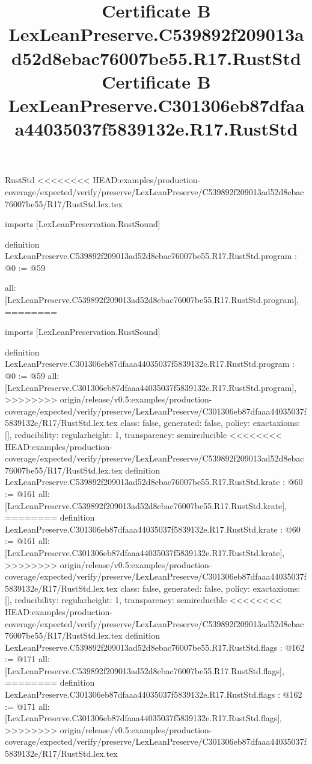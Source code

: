 \begin{lexlean}{RustStd}
<<<<<<<< HEAD:examples/production-coverage/expected/verify/preserve/LexLeanPreserve/C539892f209013ad52d8ebac76007be55/R17/RustStd.lex.tex
\title{Certificate B LexLeanPreserve.C539892f209013ad52d8ebac76007be55.R17.RustStd}
\begin{coremodule}
imports [LexLeanPreservation.RustSound]

definition LexLeanPreserve.C539892f209013ad52d8ebac76007be55.R17.RustStd.program : @0 := @59 {
  all: [LexLeanPreserve.C539892f209013ad52d8ebac76007be55.R17.RustStd.program],
========
\title{Certificate B LexLeanPreserve.C301306eb87dfaaa44035037f5839132e.R17.RustStd}
\begin{coremodule}
imports [LexLeanPreservation.RustSound]

definition LexLeanPreserve.C301306eb87dfaaa44035037f5839132e.R17.RustStd.program : @0 := @59 {
  all: [LexLeanPreserve.C301306eb87dfaaa44035037f5839132e.R17.RustStd.program],
>>>>>>>> origin/release/v0.5:examples/production-coverage/expected/verify/preserve/LexLeanPreserve/C301306eb87dfaaa44035037f5839132e/R17/RustStd.lex.tex
  class: false,
  generated: false,
  policy: exact{axioms: []},
  reducibility: regular{height: 1},
  transparency: semireducible
}
<<<<<<<< HEAD:examples/production-coverage/expected/verify/preserve/LexLeanPreserve/C539892f209013ad52d8ebac76007be55/R17/RustStd.lex.tex
definition LexLeanPreserve.C539892f209013ad52d8ebac76007be55.R17.RustStd.krate : @60 := @161 {
  all: [LexLeanPreserve.C539892f209013ad52d8ebac76007be55.R17.RustStd.krate],
========
definition LexLeanPreserve.C301306eb87dfaaa44035037f5839132e.R17.RustStd.krate : @60 := @161 {
  all: [LexLeanPreserve.C301306eb87dfaaa44035037f5839132e.R17.RustStd.krate],
>>>>>>>> origin/release/v0.5:examples/production-coverage/expected/verify/preserve/LexLeanPreserve/C301306eb87dfaaa44035037f5839132e/R17/RustStd.lex.tex
  class: false,
  generated: false,
  policy: exact{axioms: []},
  reducibility: regular{height: 1},
  transparency: semireducible
}
<<<<<<<< HEAD:examples/production-coverage/expected/verify/preserve/LexLeanPreserve/C539892f209013ad52d8ebac76007be55/R17/RustStd.lex.tex
definition LexLeanPreserve.C539892f209013ad52d8ebac76007be55.R17.RustStd.flags : @162 := @171 {
  all: [LexLeanPreserve.C539892f209013ad52d8ebac76007be55.R17.RustStd.flags],
========
definition LexLeanPreserve.C301306eb87dfaaa44035037f5839132e.R17.RustStd.flags : @162 := @171 {
  all: [LexLeanPreserve.C301306eb87dfaaa44035037f5839132e.R17.RustStd.flags],
>>>>>>>> origin/release/v0.5:examples/production-coverage/expected/verify/preserve/LexLeanPreserve/C301306eb87dfaaa44035037f5839132e/R17/RustStd.lex.tex
}}}
\end{coremodule}}
\end{coremodule}
\end{lexlean}
